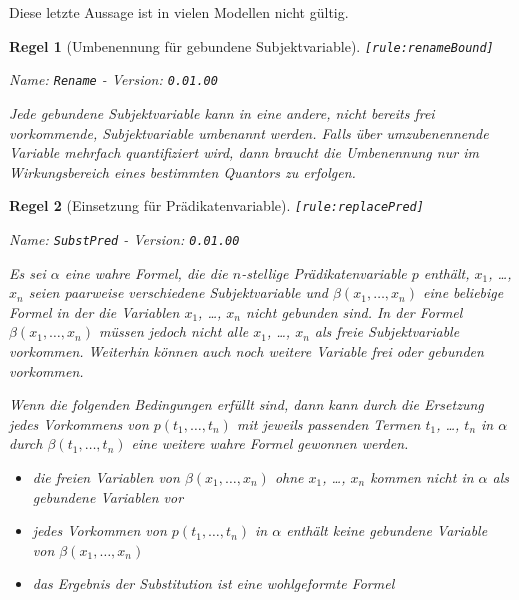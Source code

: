 \documentclass[a4paper,german,10pt,twoside]{book}
\newtheorem{rul}{Regel}
\theoremstyle{definition}
\theoremstyle{remark}
\begin{document}
\par
Diese letzte Aussage ist in vielen Modellen nicht g{\"u}ltig.


\begin{rul}[Umbenennung f{\"u}r gebundene Subjektvariable]
\label{rule:renameBound} \hypertarget{rule:renameBound}{}
{\tt \tiny [\verb]rule:renameBound]]}

\par
{\em   Name: \verb]Rename]  -  Version: \verb]0.01.00]}


Jede gebundene Subjektvariable kann in eine andere, nicht bereits frei vorkommende, Subjektvariable umbenannt werden. Falls {\"u}ber umzubenennende Variable mehrfach quantifiziert wird, dann braucht die Umbenennung nur im Wirkungsbereich eines bestimmten Quantors zu erfolgen.
\end{rul}


\begin{rul}[Einsetzung f{\"u}r Pr{\"a}dikatenvariable]
\label{rule:replacePred} \hypertarget{rule:replacePred}{}
{\tt \tiny [\verb]rule:replacePred]]}

\par
{\em   Name: \verb]SubstPred]  -  Version: \verb]0.01.00]}


Es sei $\alpha$ eine wahre Formel, die die $n$-stellige Pr{\"a}dikatenvariable $p$ enth{\"a}lt, $x_1$, \ldots, $x_n$ seien paarweise verschiedene Subjektvariable und $\beta(x_1, \ldots, x_n)$ eine beliebige Formel in der die Variablen $x_1$, \ldots, $x_n$ nicht gebunden sind. In der Formel $\beta(x_1, \ldots, x_n)$ m{\"u}ssen jedoch nicht alle $x_1$, \ldots, $x_n$ als freie Subjektvariable vorkommen. 
Weiterhin k{\"o}nnen auch noch weitere Variable frei oder gebunden vorkommen. 

Wenn die folgenden Bedingungen erf{\"u}llt sind, dann kann durch die Ersetzung jedes Vorkommens von $p(t_1, \ldots, t_n)$ mit jeweils passenden Termen $t_1$, \ldots, $t_n$ in $\alpha$ durch $\beta(t_1, \ldots, t_n)$ eine weitere wahre Formel gewonnen werden.

\begin{itemize}

\item 
die freien Variablen von $\beta(x_1, \ldots, x_n)$ ohne $x_1$, \ldots, $x_n$ kommen nicht in $\alpha$ als gebundene Variablen vor

\item
jedes Vorkommen von $p(t_1, \ldots, t_n)$ in $\alpha$ enth{\"a}lt keine gebundene Variable von $\beta(x_1, \ldots, x_n)$

\item
das Ergebnis der Substitution ist eine wohlgeformte Formel

\end{itemize}
\end{rul}
\end{document}
